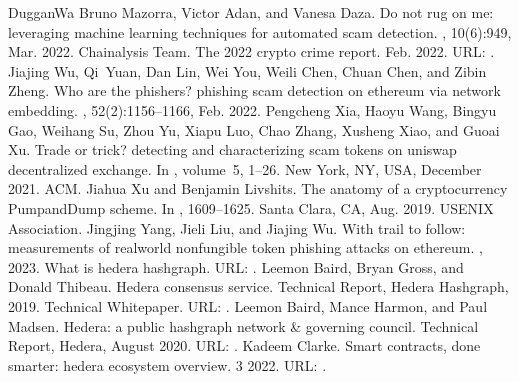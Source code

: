 \documentclass[letterpaper,10pt,english]{jupyterBook}
\begin{document}
\begin{sphinxthebibliography}{DugganWa}
\sphinxAtStartPar
Bruno Mazorra, Victor Adan, and Vanesa Daza. Do not rug on me: leveraging machine learning techniques for automated scam detection. , 10(6):949, Mar. 2022.
\sphinxAtStartPar
Chainalysis Team. The 2022 crypto crime report. Feb. 2022. URL: .
\sphinxAtStartPar
Jiajing Wu, Qi Yuan, Dan Lin, Wei You, Weili Chen, Chuan Chen, and Zibin Zheng. Who are the phishers? phishing scam detection on ethereum via network embedding. , 52(2):1156–1166, Feb. 2022.
\sphinxAtStartPar
Pengcheng Xia, Haoyu Wang, Bingyu Gao, Weihang Su, Zhou Yu, Xiapu Luo, Chao Zhang, Xusheng Xiao, and Guoai Xu. Trade or trick? detecting and characterizing scam tokens on uniswap decentralized exchange. In , volume 5, 1–26. New York, NY, USA, December 2021. ACM.
\sphinxAtStartPar
Jiahua Xu and Benjamin Livshits. The anatomy of a cryptocurrency Pump\sphinxhyphen{}and\sphinxhyphen{}Dump scheme. In , 1609–1625. Santa Clara, CA, Aug. 2019. USENIX Association.
\sphinxAtStartPar
Jingjing Yang, Jieli Liu, and Jiajing Wu. With trail to follow: measurements of real\sphinxhyphen{}world non\sphinxhyphen{}fungible token phishing attacks on ethereum. , 2023.
\sphinxAtStartPar
What is hedera hashgraph. URL: .
\sphinxAtStartPar
Leemon Baird, Bryan Gross, and Donald Thibeau. Hedera consensus service. Technical Report, Hedera Hashgraph, 2019. Technical Whitepaper. URL: .
\sphinxAtStartPar
Leemon Baird, Mance Harmon, and Paul Madsen. Hedera: a public hashgraph network \& governing council. Technical Report, Hedera, August 2020. URL: .
\sphinxAtStartPar
Kadeem Clarke. Smart contracts, done smarter: hedera ecosystem overview. 3 2022. URL: .

\end{sphinxthebibliography}
\end{document}
